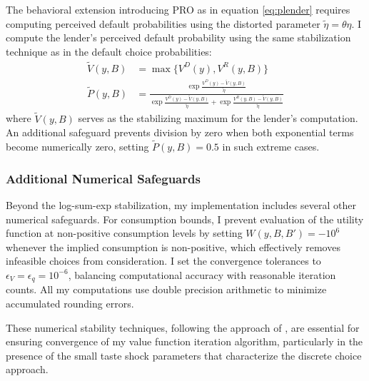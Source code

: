 \documentclass[12pt]{article}
\theoremstyle{plain}
\begin{document}
The behavioral extension introducing PRO as in equation \eqref{eq:plender}
requires computing perceived default probabilities using the distorted
parameter $\tilde{\eta} = \theta \eta$. I compute the lender's perceived
default probability using the same stabilization technique as in the default
choice probabilities:
\begin{align}
	\tilde{V}(y,B) & = \max\{V^D(y), V^R(y,B)\}                                                                                                                                 \\
	\tilde{P}(y,B) & = \frac{\exp\frac{V^D(y)-\tilde{V}(y,B)}{\tilde{\eta}}}{\exp\frac{V^D(y)-\tilde{V}(y,B)}{\tilde{\eta}} + \exp\frac{V^R(y,B)-\tilde{V}(y,B)}{\tilde{\eta}}}
\end{align}
where $\tilde{V}(y,B)$ serves as the stabilizing maximum for the lender's
computation. An additional safeguard prevents division by zero when both
exponential terms become numerically zero, setting $\tilde{P}(y,B) = 0.5$ in
such extreme cases.

\subsubsection{Additional Numerical Safeguards}

Beyond the log-sum-exp stabilization, my implementation includes several other
numerical safeguards. For consumption bounds, I prevent evaluation of the
utility function at non-positive consumption levels by setting $W(y,B,B') =
	-10^6$ whenever the implied consumption is non-positive, which effectively
removes infeasible choices from consideration. I set the convergence tolerances
to $\epsilon_V = \epsilon_q = 10^{-6}$, balancing computational accuracy with
reasonable iteration counts. All my computations use double precision
arithmetic to minimize accumulated rounding errors.

These numerical stability techniques, following the approach of
\citep{MIHALACHEOREEF2024}, are essential for ensuring convergence of my value
function iteration algorithm, particularly in the presence of the small taste
shock parameters that characterize the discrete choice approach.
\end{document}
